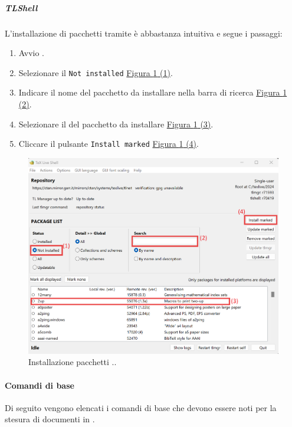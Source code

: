 \subparagraph{TLShell}
\label{subpar:TLShell}
L'installazione di pacchetti tramite  è abbastanza intuitiva e segue i passaggi:
\begin{enumerate}
    \item Avvio .
    \item Selezionare il  \texttt{Not installed} \hyperref[fig:installazione_pacchetti]{Figura \ref{fig:installazione_pacchetti} (1)}.
    \item Indicare il nome del pacchetto da installare nella barra di ricerca \hyperref[fig:installazione_pacchetti]{Figura \ref{fig:installazione_pacchetti} (2)}.
    \item Selezionare il  del pacchetto da installare \hyperref[fig:installazione_pacchetti]{Figura \ref{fig:installazione_pacchetti} (3)}.
    \item Cliccare il pulsante \texttt{Install marked} \hyperref[fig:installazione_pacchetti]{Figura \ref{fig:installazione_pacchetti} (4)}.
\end{enumerate}
\begin{figure}[H]
    \includegraphics[scale=0.7]{Sezioni/ProcessiDiSupporto/Immagini/installazione_pacchetti.png}
    \caption{Installazione pacchetti ..}
    \label{fig:installazione_pacchetti}
\end{figure}

\paragraph{Comandi di base}
\label{par:comandi_di_base}
Di seguito vengono elencati i comandi di base che devono essere noti per la stesura di documenti in .

